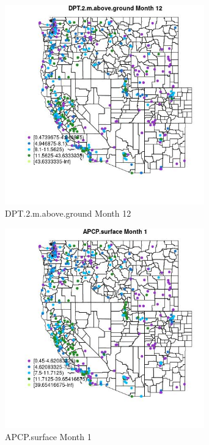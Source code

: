 \begin{figure} 
\centering  
\includegraphics[width=0.77\textwidth]{Code_Outputs/ML_input_report_ML_input_PM25_Step5_part_d_de_duplicated_aves_ML_input_MapObsMo12DPT2maboveground.jpg} 
\caption{\label{fig:ML_input_report_ML_input_PM25_Step5_part_d_de_duplicated_aves_ML_inputMapObsMo12DPT2maboveground}DPT.2.m.above.ground Month 12} 
\end{figure} 
 

\begin{figure} 
\centering  
\includegraphics[width=0.77\textwidth]{Code_Outputs/ML_input_report_ML_input_PM25_Step5_part_d_de_duplicated_aves_ML_input_MapObsMo1APCPsurface.jpg} 
\caption{\label{fig:ML_input_report_ML_input_PM25_Step5_part_d_de_duplicated_aves_ML_inputMapObsMo1APCPsurface}APCP.surface Month 1} 
\end{figure} 
 

